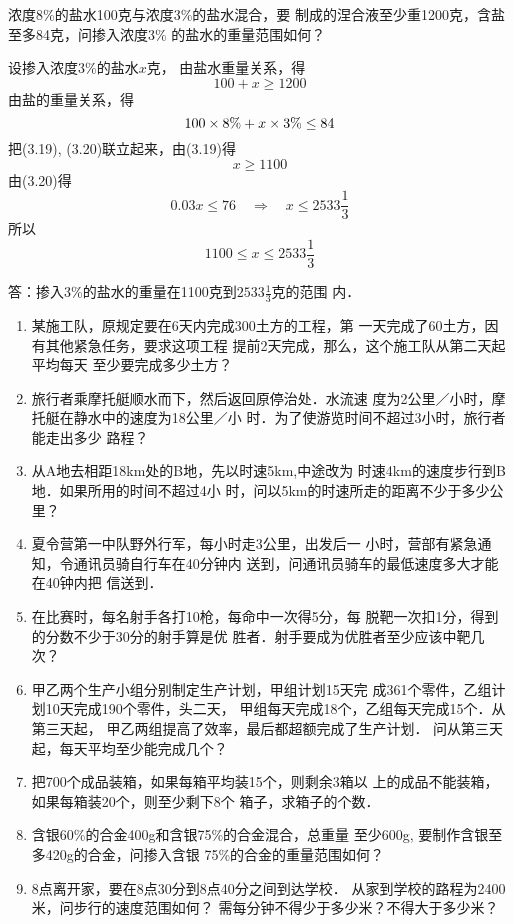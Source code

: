 \begin{example}
浓度8\%的盐水100克与浓度3\%的盐水混合，要
制成的涅合液至少重1200克，含盐至多84克，问掺入浓度3\%
的盐水的重量范围如何？
\end{example}


\begin{solution}
设掺入浓度3\%的盐水$x$克，
由盐水重量关系，得
\begin{equation}
    100+x\ge 1200
\end{equation}
由盐的重量关系，得
\begin{equation}
    100\times8\%+x \times 3\%\le 84
\end{equation}
把(3.19), (3.20)联立起来，由(3.19)得
\[x\ge 1100\]
由(3.20)得
\[0.03x\le 76\quad \Rightarrow\quad 
x\le 2533\frac{1}{3}\]
所以
\[1100\le x\le 2533\frac{1}{3}\]

答：掺入3\%的盐水的重量在1100克到$2533\frac{1}{3}$克的范围
内．
\end{solution}


\begin{ex}
\begin{enumerate}
    \item 某施工队，原规定要在6天内完成300土方的工程，第
    一天完成了60土方，因有其他紧急任务，要求这项工程
    提前2天完成，那么，这个施工队从第二天起平均每天
    至少要完成多少土方？
    \item 旅行者乘摩托艇顺水而下，然后返回原停治处．水流速
    度为2公里／小时，摩托艇在静水中的速度为18公里／小
    时．为了使游览时间不超过3小时，旅行者能走出多少
    路程？
    \item 从A地去相距18km处的B地，先以时速5km,中途改为
    时速4km的速度步行到B地．如果所用的时间不超过4小
    时，问以5km的时速所走的距离不少于多少公里？
    \item 夏令营第一中队野外行军，每小时走3公里，出发后一
    小时，营部有紧急通知，令通讯员骑自行车在40分钟内
    送到，问通讯员骑车的最低速度多大才能在40钟内把
    信送到．
    \item 在比赛时，每名射手各打10枪，每命中一次得5分，每
    脱靶一次扣1分，得到的分数不少于30分的射手算是优
    胜者．射手要成为优胜者至少应该中靶几次？
    \item 
    甲乙两个生产小组分别制定生产计划，甲组计划15天完
    成361个零件，乙组计划10天完成190个零件，头二天，
    甲组每天完成18个，乙组每天完成15个．从第三天起，
    甲乙两组提高了效率，最后都超额完成了生产计划．
    问从第三天起，每天平均至少能完成几个？
    \item 把700个成品装箱，如果每箱平均装15个，则剩余3箱以
上的成品不能装箱，如果每箱装20个，则至少剩下8个
箱子，求箱子的个数．
\item 
含银60\%的合金400g和含银75\%的合金混合，总重量
至少600g, 要制作含银至多420g的合金，问掺入含银
75\%的合金的重量范围如何？
\item 
8点离开家，要在8点30分到8点40分之间到达学校．
从家到学校的路程为2400米，问步行的速度范围如何？
需每分钟不得少于多少米？不得大于多少米？
\end{enumerate}
\end{ex}


